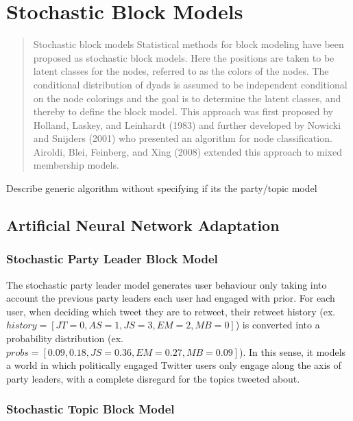 \section{Stochastic Block Models}\label{sec:SBMs}

\begin{quote}
Stochastic block models
Statistical methods for block modeling have been proposed as stochastic
block models. Here the positions are taken to be latent classes for the nodes,
referred to as the colors of the nodes. The conditional distribution of dyads is
assumed to be independent conditional on the node colorings and the goal is to
determine the latent classes, and thereby to define the block model. This
approach was first proposed by Holland, Laskey, and Leinhardt (1983) and further
developed by Nowicki and Snijders (2001) who presented an algorithm for node
classification. Airoldi, Blei, Feinberg, and Xing (2008) extended this approach
to mixed membership models. \cite{robins2013tutorial}
\end{quote}

Describe generic algorithm without specifying if its the party/topic model

\subsection{Artificial Neural Network Adaptation}\label{sec:ANNAdaptation}

\subsubsection{Stochastic Party Leader Block Model}\label{sec:SPLBM}

The stochastic party leader model generates user behaviour only taking into
account the previous party leaders each user had engaged with prior. For each
user, when deciding which tweet they are to retweet, their retweet history
(ex.\ $history=[JT=0,AS=1,JS=3,EM=2,MB=0]$) is converted into a probability
distribution (ex.\ $probs=[0.09,0.18,JS=0.36,EM=0.27,MB=0.09]$). In this sense,
it models a world in which politically engaged Twitter users only engage along
the axis of party leaders, with a complete disregard for the topics tweeted
about.

\subsubsection{Stochastic Topic Block Model}\label{sec:STBM}

